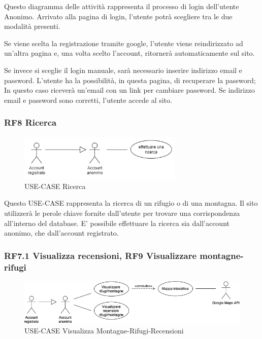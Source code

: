 \documentclass[a4paper,12pt]{article}
\begin{document}
Questo diagramma delle attività rappresenta il processo di login dell'utente Anonimo. 
Arrivato alla pagina di login, l'utente potrà scegliere tra le due modalità presenti.

Se viene scelta la registrazione tramite google, l'utente viene reindirizzato ad un'altra pagina e, una volta scelto l'account, ritornerà automaticamente sul sito.

Se invece si sceglie il login manuale, sarà necessario inserire indirizzo email e password.
L'utente ha la possibilità, in questa pagina, di recuperare la password; In questo caso riceverà un'email con un link per cambiare password.
Se indirizzo email e password sono corretti, l'utente accede al sito.


\subsubsection*{RF8 Ricerca}
\begin{figure}[H]
   \centering
   \includegraphics[width=0.7\textwidth]{img-D2/ricerca.png}
    \caption{USE-CASE Ricerca}
\end{figure}

Questo USE-CASE rappresenta la ricerca di un rifugio o di una montagna.
Il sito utilizzerà le perole chiave fornite dall'utente per trovare una corrispondenza all'interno del database.
E' possibile effettuare la ricerca sia dall'account anonimo, che dall'account registrato.

\subsubsection*{RF7.1 Visualizza recensioni, RF9 Visualizzare montagne-rifugi}
\begin{figure}[H]
   \centering
   \includegraphics[width=1.0\textwidth]{img-D2/visualizzare_montagne.png}
    \caption{USE-CASE Visualizza Montagne-Rifugi-Recensioni}
\end{figure}
\end{document}
